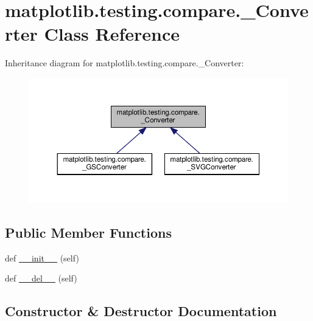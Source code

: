 \hypertarget{classmatplotlib_1_1testing_1_1compare_1_1__Converter}{}\section{matplotlib.\+testing.\+compare.\+\_\+\+Converter Class Reference}
\label{classmatplotlib_1_1testing_1_1compare_1_1__Converter}


Inheritance diagram for matplotlib.\+testing.\+compare.\+\_\+\+Converter\+:
\nopagebreak
\begin{figure}[H]
\begin{center}
\leavevmode
\includegraphics[width=350pt]{classmatplotlib_1_1testing_1_1compare_1_1__Converter__inherit__graph}
\end{center}
\end{figure}
\subsection*{Public Member Functions}
\begin{DoxyCompactItemize}
\item 
def \hyperlink{classmatplotlib_1_1testing_1_1compare_1_1__Converter_a5db949414a8cef43a4f64cd526bd6e04}{\+\_\+\+\_\+init\+\_\+\+\_\+} (self)
\item 
def \hyperlink{classmatplotlib_1_1testing_1_1compare_1_1__Converter_a65e038b7478f498f342d8afc8e64fff7}{\+\_\+\+\_\+del\+\_\+\+\_\+} (self)
\end{DoxyCompactItemize}


\subsection{Constructor \& Destructor Documentation}
\mbox{\label{classmatplotlib_1_1testing_1_1compare_1_1__Converter_a5db949414a8cef43a4f64cd526bd6e04}} 
